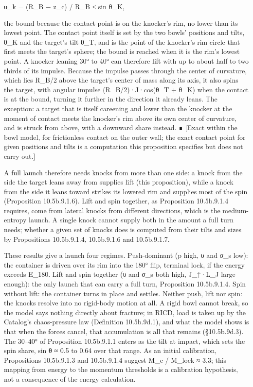 \documentclass[
]{article}
\begin{document}
υ\_k = (R\_B − z\_c) / R\_B ≤ sin θ\_K,

the bound because the contact point is on the knocker's rim, no lower
than its lowest point. The contact point itself is set by the two bowls'
positions and tilts, θ\_K and the target's tilt θ\_T, and is the point
of the knocker's rim circle that first meets the target's sphere; the
bound is reached when it is the rim's lowest point. A knocker leaning
30° to 40° can therefore lift with up to about half to two thirds of its
impulse. Because the impulse passes through the center of curvature,
which lies R\_B/2 above the target's center of mass along its axis, it
also spins the target, with angular impulse (R\_B/2)·J·cos(θ\_T + θ\_K)
when the contact is at the bound, turning it further in the direction it
already leans. The exception: a target that is itself careening and
lower than the knocker at the moment of contact meets the knocker's rim
above its own center of curvature, and is struck from above, with a
downward share instead. ∎ {[}Exact within the bowl model, for
frictionless contact on the outer wall; the exact contact point for
given positions and tilts is a computation this proposition specifies
but does not carry out.{]}

A full launch therefore needs knocks from more than one side: a knock
from the side the target leans away from supplies lift (this
proposition), while a knock from the side it leans toward strikes its
lowered rim and supplies most of the spin (Proposition 10.5b.9.1.6).
Lift and spin together, as Proposition 10.5b.9.1.4 requires, come from
lateral knocks from different directions, which is the medium-entropy
launch. A single knock cannot supply both in the amount a full turn
needs; whether a given set of knocks does is computed from their tilts
and sizes by Propositions 10.5b.9.1.4, 10.5b.9.1.6 and 10.5b.9.1.7.

These results give a launch four regimes. Push-dominant (p high, υ and
σ\_s low): the container is driven over its rim into the 180° flip,
terminal lock, if the energy exceeds E\_180. Lift and spin together (υ
and σ\_s both high, J\_↑·L\_J large enough): the only launch that can
carry a full turn, Proposition 10.5b.9.1.4. Spin without lift: the
container turns in place and settles. Neither push, lift nor spin: the
knocks resolve into no rigid-body motion at all. A rigid bowl cannot
break, so the model says nothing directly about fracture; in RICD, load
is taken up by the Catalog's chaos-pressure law (Definition 10.5b.9d.1),
and what the model shows is that when the forces cancel, that
accumulation is all that remains (§10.5b.9d.3). The 30--40° of
Proposition 10.5b.9.1.1 enters as the tilt at impact, which sets the
spin share, sin θ ≈ 0.5 to 0.64 over that range. As an initial
calibration, Propositions 10.5b.9.1.3 and 10.5b.9.1.4 suggest M\_c /
M\_lock ≈ 3.3; this mapping from energy to the momentum thresholds is a
calibration hypothesis, not a consequence of the energy calculation.
\end{document}
